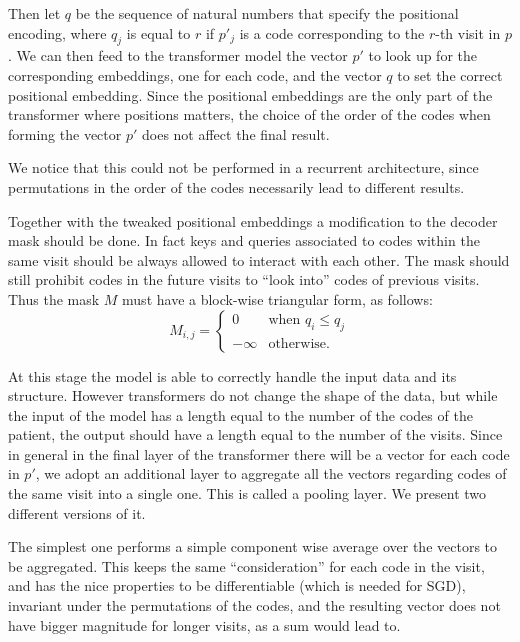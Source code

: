 \documentclass[]{marticle}
\begin{document}
Then let $q$ be the sequence of natural numbers that specify the positional encoding, where $q_j$ is
equal to $r$ if $p'_j$ is a code corresponding to the $r$-th visit in $p$. We can then feed to the
transformer model the vector $p'$ to look up for the corresponding embeddings, one for each code,
and the vector $q$ to set the correct positional embedding. Since the positional embeddings are the
only part of the transformer where positions matters, the choice of the order of the codes when
forming the vector $p'$ does not affect the final result.

We notice that this could not be performed in a recurrent architecture, since permutations in the
order of the codes necessarily lead to different results.

Together with the tweaked positional embeddings a modification to the decoder mask should be done.
In fact keys and queries associated to codes within the same visit should be always allowed to
interact with each other. The mask should still prohibit codes in the future visits to ``look
into'' codes of previous visits. Thus the mask $M$ must have a block-wise triangular form, as
follows:
\begin{equation*}
    M_{i,j} = \begin{cases}
        0       & \text{when $q_i\leq q_j$} \\
        -\infty & \text{otherwise.}
    \end{cases}
\end{equation*}

At this stage the model is able to correctly handle the input data and its structure. However
transformers do not change the shape of the data, but while the input of the model has a length
equal to the number of the codes of the patient, the output should have a length equal to the number
of the visits. Since in general in the final layer of the transformer there will be a vector for
each code in $p'$, we adopt an additional layer to aggregate all the vectors regarding codes of the
same visit into a single one. This is called a pooling layer. We present two different versions of
it.

The simplest one performs a simple component wise average over the vectors to be aggregated. This
keeps the same ``consideration'' for each code in the visit, and has the nice properties to be
differentiable (which is needed for SGD), invariant under the permutations of the codes, and
the resulting vector does not have bigger magnitude for longer visits, as a sum would lead to.
\end{document}
